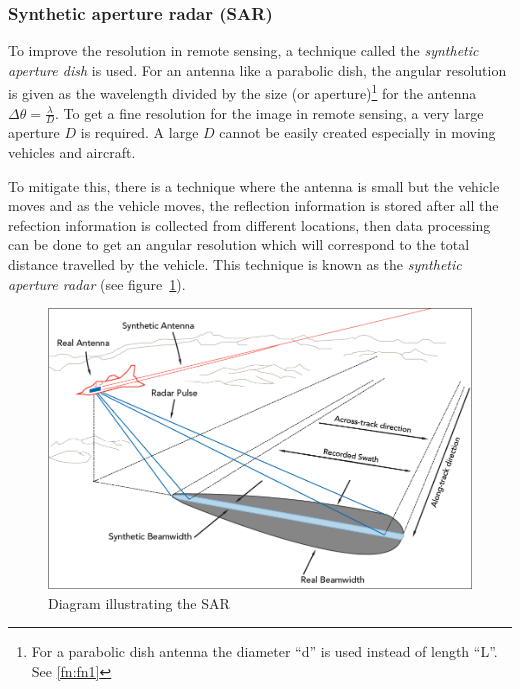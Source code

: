 \subsubsection{Synthetic aperture radar (SAR)}
To improve the resolution in remote sensing, a technique called the \textit{synthetic aperture dish} is used. For an antenna like a parabolic dish, the angular resolution is given as the wavelength divided by the size (or aperture)\footnote{For a parabolic dish antenna the diameter \textquotedblleft d\textquotedblright \hspace{0.02in} is used instead of length \textquotedblleft L\textquotedblright. See \autoref{fn:fn1}} for the antenna $\Delta \theta = \frac{\lambda}{D}$. To get a fine resolution for the image in remote sensing, a very large aperture $D$ is required. A large $D$ cannot be easily created especially in moving vehicles and aircraft.

To mitigate this, there is a technique where the antenna is small but the vehicle moves and as the vehicle moves, the reflection information is stored after all the refection information is collected from different locations, then data processing can be done to get an angular resolution which will correspond to the total distance travelled by the vehicle. This technique is known as the \textit{synthetic aperture radar} (see figure~\ref{fig:sar2}).
\begin{figure}[h]
\centering
\includegraphics[scale=0.35]{./graphics/sar2}
\caption{Diagram illustrating the SAR}
\label{fig:sar2}
\end{figure}

